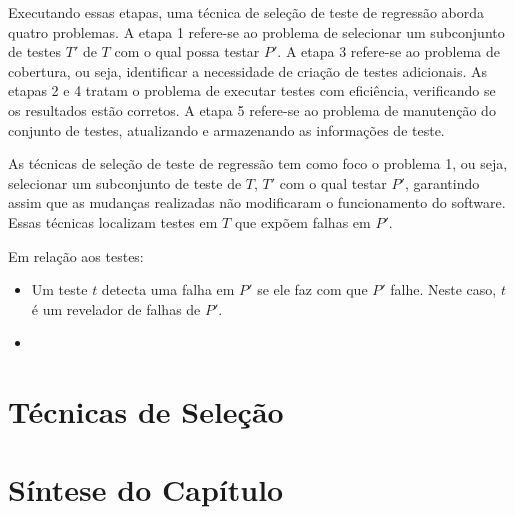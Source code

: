 Executando essas etapas, uma técnica de seleção de teste de regressão aborda quatro problemas. A etapa 1 refere-se ao problema de selecionar um subconjunto de testes $T'$ de $T$ com o qual possa testar $P'$. A etapa 3 refere-se ao problema de cobertura, ou seja, identificar a necessidade de criação de testes adicionais. As etapas 2 e 4 tratam o problema de executar testes com eficiência, verificando se os resultados estão corretos. A etapa 5 refere-se ao problema de manutenção do conjunto de testes, atualizando e armazenando as informações de teste.

As técnicas de seleção de teste de regressão tem como foco o problema 1, ou seja, selecionar um subconjunto de teste de $T$, $T'$ com o qual testar $P'$, garantindo assim que as mudanças realizadas não modificaram o funcionamento do software. Essas técnicas localizam testes em $T$ que expõem falhas em $P'$.

Em relação aos testes: \cite{536955}
\begin{itemize}
    \item Um teste $t$ detecta uma falha em $P'$ se ele faz com que $P'$ falhe. Neste caso, $t$ é um revelador de falhas de $P'$.
    \item 
\end{itemize}

\section{Técnicas de Seleção}

\section{Síntese do Capítulo}
